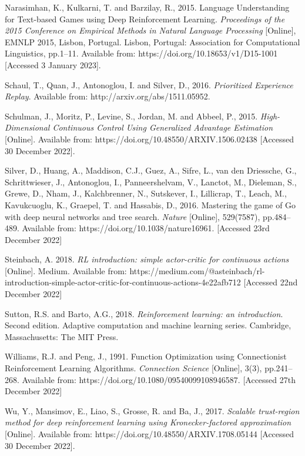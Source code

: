 \documentclass{article}
\begin{document}
Narasimhan, K., Kulkarni, T. and Barzilay, R., 2015. Language Understanding for Text-based Games using Deep Reinforcement Learning. \emph{Proceedings of the 2015 Conference on Empirical Methods in Natural Language Processing} [Online], EMNLP 2015, Lisbon, Portugal. Lisbon, Portugal: Association for Computational Linguistics, pp.1–11. Available from: https://doi.org/10.18653/v1/D15-1001 [Accessed 3 January 2023].

Schaul, T., Quan, J., Antonoglou, I. and Silver, D., 2016. \emph{Prioritized Experience Replay}. Available from: http://arxiv.org/abs/1511.05952.

Schulman, J., Moritz, P., Levine, S., Jordan, M. and Abbeel, P., 2015. \emph{High-Dimensional Continuous Control Using Generalized Advantage Estimation}  [Online]. Available from: https://doi.org/10.48550/ARXIV.1506.02438 [Accessed 30 December 2022].

Silver, D., Huang, A., Maddison, C.J., Guez, A., Sifre, L., van den Driessche, G., Schrittwieser, J., Antonoglou, I., Panneershelvam, V., Lanctot, M., Dieleman, S., Grewe, D., Nham, J., Kalchbrenner, N., Sutskever, I., Lillicrap, T., Leach, M., Kavukcuoglu, K., Graepel, T. and Hassabis, D., 2016. Mastering the game of Go with deep neural networks and tree search. \emph{Nature} [Online], 529(7587), pp.484–489. Available from: https://doi.org/10.1038/nature16961. [Accessed 23rd December 2022]

Steinbach, A. 2018. \emph{RL introduction: simple actor-critic for continuous actions} [Online]. Medium. Available from: https://medium.com/@asteinbach/rl-introduction-simple-actor-critic-for-continuous-actions-4e22afb712 [Accessed 22nd December 2022]

Sutton, R.S. and Barto, A.G., 2018. \emph{Reinforcement learning: an introduction}. Second edition. Adaptive computation and machine learning series. Cambridge, Massachusetts: The MIT Press.

Williams, R.J. and Peng, J., 1991. Function Optimization using Connectionist Reinforcement Learning Algorithms. \emph{Connection Science} [Online], 3(3), pp.241–268. Available from: https://doi.org/10.1080/09540099108946587. [Accessed 27th December 2022]

Wu, Y., Mansimov, E., Liao, S., Grosse, R. and Ba, J., 2017. \emph{Scalable trust-region method for deep reinforcement learning using Kronecker-factored approximation} [Online]. Available from: https://doi.org/10.48550/ARXIV.1708.05144 [Accessed 30 December 2022].
\end{document}
